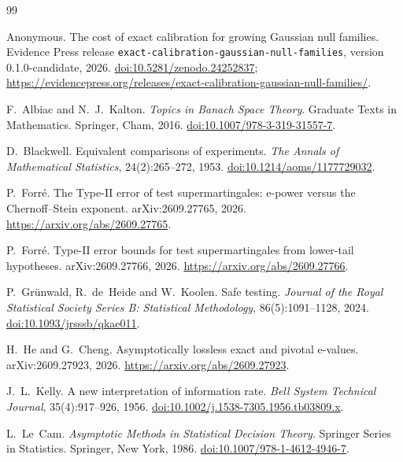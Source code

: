 \documentclass[11pt,a4paper]{article}
\theoremstyle{definition}
\theoremstyle{remark}
\begin{document}
\begin{thebibliography}{99}

Anonymous.
\newblock The cost of exact calibration for growing Gaussian null families.
\newblock Evidence Press release \texttt{exact-calibration-gaussian-null-families}, version 0.1.0-candidate, 2026.
\newblock \href{https://doi.org/10.5281/zenodo.24252837}{doi:10.5281/zenodo.24252837};
\url{https://evidencepress.org/releases/exact-calibration-gaussian-null-families/}.

F.~Albiac and N.~J.~Kalton.
\newblock \emph{Topics in Banach Space Theory}.
\newblock Graduate Texts in Mathematics. Springer, Cham, 2016.
\newblock \href{https://doi.org/10.1007/978-3-319-31557-7}{doi:10.1007/978-3-319-31557-7}.

D.~Blackwell.
\newblock Equivalent comparisons of experiments.
\newblock \emph{The Annals of Mathematical Statistics}, 24(2):265--272, 1953.
\newblock \href{https://doi.org/10.1214/aoms/1177729032}{doi:10.1214/aoms/1177729032}.

P.~Forr\'e.
\newblock The Type-II error of test supermartingales: e-power versus the Chernoff--Stein exponent.
\newblock arXiv:2609.27765, 2026.
\newblock \url{https://arxiv.org/abs/2609.27765}.

P.~Forr\'e.
\newblock Type-II error bounds for test supermartingales from lower-tail hypotheses.
\newblock arXiv:2609.27766, 2026.
\newblock \url{https://arxiv.org/abs/2609.27766}.

P.~Gr\"unwald, R.~de~Heide and W.~Koolen.
\newblock Safe testing.
\newblock \emph{Journal of the Royal Statistical Society Series B: Statistical Methodology}, 86(5):1091--1128, 2024.
\newblock \href{https://doi.org/10.1093/jrsssb/qkae011}{doi:10.1093/jrsssb/qkae011}.

H.~He and G.~Cheng.
\newblock Asymptotically lossless exact and pivotal e-values.
\newblock arXiv:2609.27923, 2026.
\newblock \url{https://arxiv.org/abs/2609.27923}.

J.~L.~Kelly.
\newblock A new interpretation of information rate.
\newblock \emph{Bell System Technical Journal}, 35(4):917--926, 1956.
\newblock \href{https://doi.org/10.1002/j.1538-7305.1956.tb03809.x}{doi:10.1002/j.1538-7305.1956.tb03809.x}.

L.~Le~Cam.
\newblock \emph{Asymptotic Methods in Statistical Decision Theory}.
\newblock Springer Series in Statistics. Springer, New York, 1986.
\newblock \href{https://doi.org/10.1007/978-1-4612-4946-7}{doi:10.1007/978-1-4612-4946-7}.


\end{thebibliography}
\end{document}
